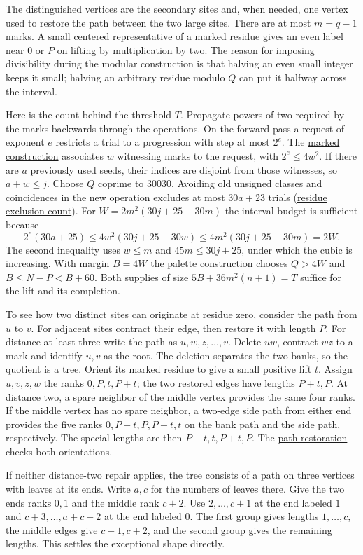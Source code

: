 \documentclass[11pt]{article}
\newcommand{\proofmodule}[2]{\href{https://github.com/Aky-lab/graceful-leaf-threshold-preprint/blob/v1.2/lean/Next/#1.lean}{#2}}
\begin{document}
The distinguished vertices are the secondary sites and, when needed,
one vertex used to restore the path between the two large sites.
There are at most $m=q-1$ marks. A small centered representative of
a marked residue gives an even label near $0$ or $P$ on lifting by
multiplication by two. The reason for imposing divisibility during
the modular construction is that halving an even small integer keeps
it small; halving an arbitrary residue modulo $Q$ can put it halfway
across the interval.

Here is the count behind the threshold $T$. Propagate powers of two
required by the marks backwards through the operations. On the forward
pass a request of exponent $e$ restricts a trial to a progression
with step at most $2^e$. The \proofmodule{ModularChargedLocalBound}{marked
construction} associates $w$ witnessing marks to the request, with
$2^e\le4w^2$. If there are $a$ previously used seeds, their indices
are disjoint from those witnesses, so $a+w\le j$. Choose $Q$ coprime
to $30030$. Avoiding old unsigned classes and coincidences in the
new operation excludes at most $30a+23$ trials
(\proofmodule{ModularCoprimeRatios}{residue exclusion count}).
For $W=2m^2(30j+25-30m)$ the interval budget is sufficient because
\[
 2^e(30a+25)\le4w^2(30j+25-30w)
             \le4m^2(30j+25-30m)=2W .
\]
The second inequality uses $w\le m$ and $45m\le30j+25$, under which
the cubic is increasing. With margin $B=4W$ the palette construction
chooses $Q>4W$ and $B\le N-P<B+60$. Both supplies of size
$5B+36m^2(n+1)=T$ suffice for the lift and its completion.

To see how two distinct sites can originate at residue zero, consider
the path from $u$ to $v$. For adjacent sites contract their edge, then
restore it with length $P$. For distance at least three write the path
as $u,w,z,\ldots,v$. Delete $uw$, contract $wz$ to a mark and identify
$u,v$ as the root. The deletion separates the two banks, so the quotient
is a tree. Orient its marked residue to give a small positive lift $t$.
Assign $u,v,z,w$ the ranks $0,P,t,P+t$; the two restored edges have
lengths $P+t,P$. At distance two, a spare neighbor of the middle vertex
provides the same four ranks. If the middle vertex has no spare neighbor,
a two-edge side path from either end provides the five ranks
$0,P-t,P,P+t,t$ on the bank path and the side path, respectively.
The special lengths are then $P-t,t,P+t,P$. The
\proofmodule{ParityPacketTwoBank}{path restoration} checks both orientations.

If neither distance-two repair applies, the tree consists of a path on
three vertices with leaves at its ends. Write $a,c$ for the numbers of
leaves there. Give the two ends ranks $0,1$ and the middle rank $c+2$.
Use $2,\ldots,c+1$ at the end labeled $1$ and $c+3,\ldots,a+c+2$ at
the end labeled $0$. The first group gives lengths $1,\ldots,c$, the
middle edges give $c+1,c+2$, and the second group gives the remaining
lengths. This settles the exceptional shape directly.
\end{document}
